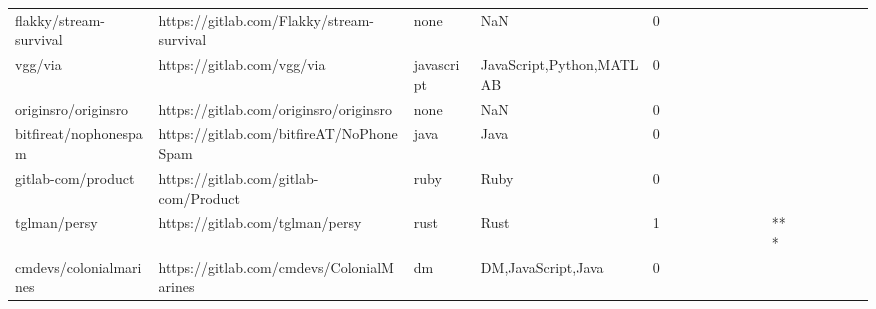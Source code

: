 \begin{tabular}{llllrlllllllllllll}
flakky/stream-survival                             &          https://gitlab.com/Flakky/stream-survival &              none &                                                NaN &       0 &         &        &           &                &                 &        &           &           &          &          &       &              &          \\
vgg/via                                            &                         https://gitlab.com/vgg/via &        javascript &                           JavaScript,Python,MATLAB &       0 &         &        &           &                &                 &        &           &           &          &          &       &              &          \\
originsro/originsro                                &             https://gitlab.com/originsro/originsro &              none &                                                NaN &       0 &         &        &           &                &                 &        &           &           &          &          &       &              &          \\
bitfireat/nophonespam                              &           https://gitlab.com/bitfireAT/NoPhoneSpam &              java &                                               Java &       0 &         &        &           &                &                 &        &           &           &          &          &       &              &          \\
gitlab-com/product                                 &              https://gitlab.com/gitlab-com/Product &              ruby &                                               Ruby &       0 &         &        &           &                &                 &        &           &           &          &          &       &              &          \\
tglman/persy                                       &                    https://gitlab.com/tglman/persy &              rust &                                               Rust &       1 &         &        &           &                &                 &        &           &       *** &          &          &       &              &          \\
cmdevs/colonialmarines                             &          https://gitlab.com/cmdevs/ColonialMarines &                dm &                                 DM,JavaScript,Java &       0 &         &        &           &                &                 &        &           &           &          &          &       &              &          \\

\end{tabular}
